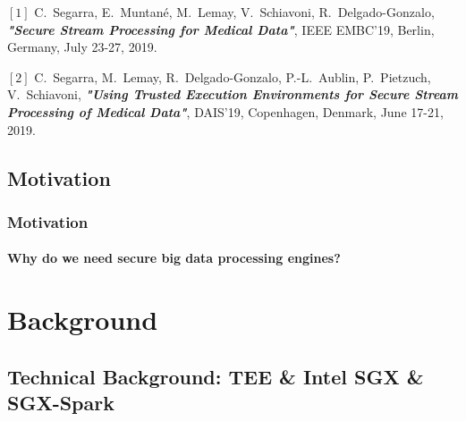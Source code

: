 \documentclass[10pt,    %
    english,            %
    xcolor=table,       %
    envcountsect,        %
    aspectratio=169     %
]{beamer}
\begin{document}
\begin{frame}
    \vspace{10pt}

    \tiny
    \begin{description}
        \item $[1]$ C.~Segarra, E.~Muntané, M.~Lemay, V.~Schiavoni, R.~Delgado-Gonzalo, \textit{\textbf{"Secure Stream Processing for Medical Data"}}, IEEE EMBC'19, Berlin, Germany, July 23-27, 2019.
        \item $[2]$ C.~Segarra, M.~Lemay, R.~Delgado-Gonzalo, P.-L.~Aublin, P.~Pietzuch, V.~Schiavoni, \textbf{\textit{"Using Trusted Execution Environments for Secure Stream Processing of Medical Data"}}, DAIS'19, Copenhagen, Denmark, June 17-21, 2019.
    \end{description}

\end{frame}

\subsection{Motivation}

\begin{frame}
    \frametitle{Motivation}
    \framesubtitle{Why do we need secure big data processing engines?}

    \vspace{-20pt}

    \begin{figure}[H]
        \centering
        \resizebox{0.9\linewidth}{!}{}
    \end{figure}

\end{frame}

\section{Background}
\label{sec:background}
\sectionframe

\subsection{Technical Background: TEE \& Intel SGX \& SGX-Spark}
\end{document}

